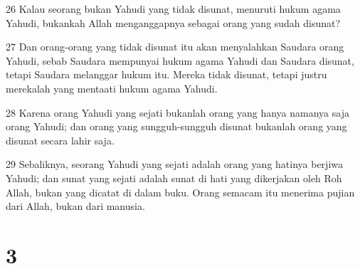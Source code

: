 \par 26 Kalau seorang bukan Yahudi yang tidak disunat, menuruti hukum agama Yahudi, bukankah Allah menganggapnya sebagai orang yang sudah disunat?
\par 27 Dan orang-orang yang tidak disunat itu akan menyalahkan Saudara orang Yahudi, sebab Saudara mempunyai hukum agama Yahudi dan Saudara disunat, tetapi Saudara melanggar hukum itu. Mereka tidak disunat, tetapi justru merekalah yang mentaati hukum agama Yahudi.
\par 28 Karena orang Yahudi yang sejati bukanlah orang yang hanya namanya saja orang Yahudi; dan orang yang sungguh-sungguh disunat bukanlah orang yang disunat secara lahir saja.
\par 29 Sebaliknya, seorang Yahudi yang sejati adalah orang yang hatinya berjiwa Yahudi; dan sunat yang sejati adalah sunat di hati yang dikerjakan oleh Roh Allah, bukan yang dicatat di dalam buku. Orang semacam itu menerima pujian dari Allah, bukan dari manusia.

\chapter{3}

